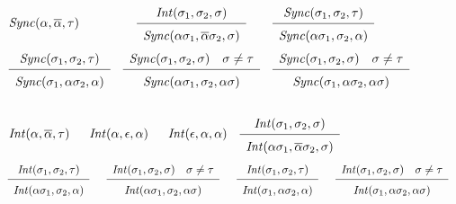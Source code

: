       \begin{table}
	\hrulefill\\[-.5cm]
	\begin{center}
	  $\begin{array}{lclcl}
		\Sync(\alpha, \overline{\alpha}, \tau) 
	      &  
		\bigfrac{\Int(\sigma_1, \sigma_2, \sigma)}{\Sync(\alpha\sigma_1, \overline{\alpha}\sigma_2, \sigma)} 
	      &
		\bigfrac{\Sync(\sigma_1, \sigma_2, \tau)}{\Sync(\alpha\sigma_1, \sigma_2, \alpha)} 
	    \\
		\bigfrac{\Sync(\sigma_1, \sigma_2, \tau)}{\Sync(\sigma_1, \alpha\sigma_2, \alpha)} 
	      &
		\bigfrac{\Sync(\sigma_1, \sigma_2, \sigma) \quad \sigma \neq \tau}{\Sync(\alpha\sigma_1, \sigma_2, \alpha\sigma)} 
	      &
		\bigfrac{\Sync(\sigma_1, \sigma_2, \sigma) \quad \sigma \neq \tau}{\Sync(\sigma_1, \alpha\sigma_2, \alpha\sigma)} 
	    \\
	  \end{array}$
	\\\hrulefill\\
	  $\begin{array}{lllll}
		\Int(\alpha, \overline{\alpha}, \tau) 
	      &  
		\; \; \Int(\alpha, \epsilon, \alpha) 
	      &
		\; \;\Int(\epsilon, \alpha, \alpha) 
	      & 
		\bigfrac{\Int(\sigma_1, \sigma_2, \sigma)}{\Int(\alpha\sigma_1, \overline{\alpha}\sigma_2, \sigma)} 
	    \\
	  \end{array}$\\

	  $\begin{array}{lclcl}
	      \bigfrac{\Int(\sigma_1, \sigma_2, \tau)}{\Int(\alpha\sigma_1, \sigma_2, \alpha)} 
	    & 
	      \; \;  \bigfrac{\Int(\sigma_1, \sigma_2, \sigma) \quad \sigma \neq \tau}{\Int(\alpha\sigma_1, \sigma_2, \alpha\sigma)} 
	    & 
	      \; \; \bigfrac{\Int(\sigma_1, \sigma_2, \tau)}{\Int(\sigma_1, \alpha\sigma_2, \alpha)} 
	    &
	      \; \; \bigfrac{\Int(\sigma_1, \sigma_2, \sigma) \quad \sigma \neq \tau}{\Int(\sigma_1, \alpha\sigma_2, \alpha\sigma)} \\
	  \end{array}$
	\end{center}

	\hrulefill%
	\caption{Synchronization relation $\Sync$ and interleaving relation $\Int$.}\label{b-sync}
      \end{table}


